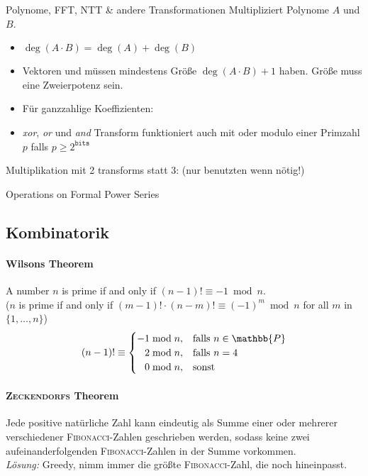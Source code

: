 \begin{algorithm}{Polynome, FFT, NTT \& andere Transformationen}
	Multipliziert Polynome $A$ und $B$.
	\begin{itemize}
		\item $\deg(A \cdot B) = \deg(A) + \deg(B)$
		\item Vektoren  und  müssen mindestens Größe
		$\deg(A \cdot B) + 1$ haben.
		Größe muss eine Zweierpotenz sein.
		\item Für ganzzahlige Koeffizienten: 
		\item \emph{xor}, \emph{or} und \emph{and} Transform funktioniert auch mit  oder modulo einer Primzahl $p$ falls $p \geq 2^{\texttt{bits}}$
	\end{itemize}
	Multiplikation mit 2 transforms statt 3: (nur benutzten wenn nötig!)
\end{algorithm}

\begin{algorithm}{Operations on Formal Power Series}
\end{algorithm}

\subsection{Kombinatorik}

\paragraph{Wilsons Theorem}
A number $n$ is prime if and only if
$(n-1)!\equiv -1\bmod{n}$.\\
($n$ is prime if and only if $(m-1)!\cdot(n-m)!\equiv(-1)^m\bmod{n}$ for all $m$ in $\{1,\dots,n\}$)
\begin{align*}
	(n-1)!\equiv\begin{cases}
		-1\bmod{n},&\mathrm{falls}~n \in \mathbb{P}\\
		\hphantom{-}2\bmod{n},&\mathrm{falls}~n = 4\\
		\hphantom{-}0\bmod{n},&\mathrm{sonst}
	\end{cases}
\end{align*}

\paragraph{\textsc{Zeckendorfs} Theorem}
Jede positive natürliche Zahl kann eindeutig als Summe einer oder mehrerer
verschiedener \textsc{Fibonacci}-Zahlen geschrieben werden, sodass keine zwei
aufeinanderfolgenden \textsc{Fibonacci}-Zahlen in der Summe vorkommen.\\
\emph{Lösung:} Greedy, nimm immer die größte \textsc{Fibonacci}-Zahl, die noch
hineinpasst.

